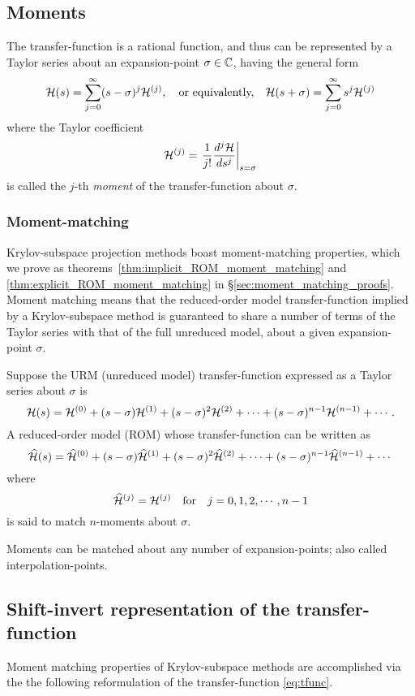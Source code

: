 \subsection{Moments}        \label{sec:moments}
The transfer-function is a rational function, and thus can be represented by a Taylor series about an expansion-point $\sigma\in\mathbb{C}$, having the general form 
\begin{equation}
                \mathcal{H}(s) = \sum_{j=0}^\infty (s-\sigma )^j \mathcal{H}^{(j)},  \quad \text{or equivalently,}\quad
  \mathcal{H}(s+\sigma) = \sum_{j=0}^\infty s^j \mathcal{H}^{(j)}
                \label{eq:tfunc_taylor}
        \end{equation}
        where the Taylor coefficient 
\begin{equation}
\mathcal{H}^{(j)} =\left. \dfrac{1}{j !}\dfrac{d^j \mathcal{H}}{d s^j}\right|_{s=\sigma}
\label{eq:moment_def}
\end{equation}
is called the $j$-th \emph{moment} of the transfer-function about $\sigma$.



\subsubsection{Moment-matching}
Krylov-subspace  projection methods boast moment-matching properties, which we prove as theorems~\ref{thm:implicit_ROM_moment_matching} and \ref{thm:explicit_ROM_moment_matching} in \S\ref{sec:moment_matching_proofs}.  Moment matching means that the reduced-order model transfer-function implied by a Krylov-subspace  method is guaranteed to share a number of  terms of the Taylor series with that of the full unreduced model, about a given expansion-point $\sigma$.  

 Suppose the URM (unreduced model) transfer-function expressed as a Taylor series about $\sigma$ is 
\[
\mathcal{H}(s) = \mathcal{H}^{(0)} + (s-\sigma)\mathcal{H}^{(1)} + (s-\sigma)^2 \mathcal{H}^{(2)} + \cdots +(s-\sigma)^{n-1} \mathcal{H}^{({n-1})} + \cdots.
\]
A reduced-order model (ROM) whose transfer-function can be written as 
\[
\widehat{\mathcal{H}}(s) = \widehat{\mathcal{H}}^{(0)}  + (s-\sigma)\widehat{\mathcal{H}}^{(1)} + (s-\sigma)^2 \widehat{\mathcal{H}}^{(2)} + \cdots +(s-\sigma)^{n-1} \widehat{\mathcal{H}}^{(n-1)} + \cdots
\]
where 
\[
\widehat{\mathcal{H}}^{(j)} = \mathcal{H}^{(j)} \quad\text{for}\quad j=0,1,2,\cdots,n-1
\]
  is said to match $n$-moments about $\sigma$.  

Moments can be matched about any number of expansion-points; also called interpolation-points.

\subsection{Shift-invert representation of the transfer-function}
Moment matching properties of Krylov-subspace  methods are accomplished via the the following reformulation of the transfer-function \eqref{eq:tfunc}.

